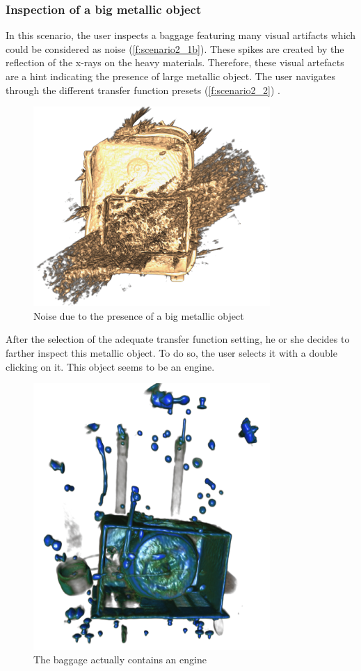 \subsubsection{Inspection of a big metallic object}

In this scenario, the user inspects a baggage featuring many visual artifacts which could be considered as noise (\autoref{f:scenario2_1b}). These spikes are created by the reflection of the x-rays on the heavy materials. Therefore, these visual artefacts are a hint indicating the presence of large metallic object. The user navigates through the different transfer function presets (\autoref{f:scenario2_2}) .
 
\begin{figure}
\centering
\includegraphics[width=9cm]{Figures/scenario2_1.PNG}
\caption{ Noise due to the presence of a big metallic object }
\label{f:scenario2_1b}
\end{figure}
After the selection of the adequate transfer function setting, he or she decides to farther inspect this metallic object. To do so, the user selects it with a double clicking on it. This object seems to be an engine.
\begin{figure}
\centering
\includegraphics[width=9cm]{Figures/scenario2_2.PNG}
\caption{ The baggage actually contains  an engine }
\label{f:scenario2_2}
\end{figure}

